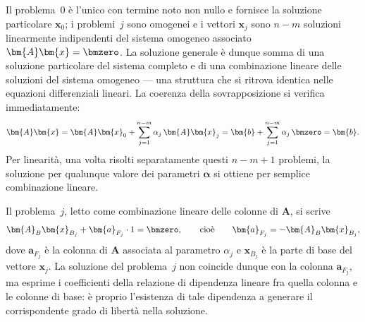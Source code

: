 Il problema~0 \`e l'unico con termine noto non nullo e fornisce
la soluzione particolare $\bm{x}_0$; i problemi~$j$ sono omogenei
e i vettori $\bm{x}_j$ sono $n-m$ soluzioni linearmente
indipendenti del sistema omogeneo associato $\bm{A}\bm{x}=\bmzero$.
La soluzione generale \`e dunque somma di una soluzione particolare
del sistema completo e di una combinazione lineare delle soluzioni
del sistema omogeneo --- una struttura che si ritrova identica
nelle equazioni differenziali lineari. La coerenza della
sovrapposizione si verifica immediatamente:
\begin{equation}
	\bm{A}\bm{x}
	= \bm{A}\bm{x}_0
	+ \sum_{j=1}^{n-m} \alpha_j\,\bm{A}\bm{x}_j
	= \bm{b} + \sum_{j=1}^{n-m} \alpha_j\,\bmzero
	= \bm{b}.
\end{equation}
Per linearit\`a, una volta risolti separatamente questi $n-m+1$
problemi, la soluzione per qualunque valore dei parametri
$\bm{\alpha}$ si ottiene per semplice combinazione lineare.

\begin{oss}
	Il problema~$j$, letto come combinazione lineare delle colonne di
	$\bm{A}$, si scrive
	\begin{equation}
		\bm{A}_B\bm{x}_{B_j} + \bm{a}_{F_j}\cdot 1 = \bmzero,
		\qquad\text{cio\`e}\qquad
		\bm{a}_{F_j} = -\bm{A}_B\bm{x}_{B_j},
	\end{equation}
	dove $\bm{a}_{F_j}$ \`e la colonna di $\bm{A}$ associata al
	parametro $\alpha_j$ e $\bm{x}_{B_j}$ \`e la parte di base del
	vettore $\bm{x}_j$. La soluzione del problema~$j$ non coincide
	dunque con la colonna $\bm{a}_{F_j}$, ma esprime i coefficienti
	della relazione di dipendenza lineare fra quella colonna e le
	colonne di base: \`e proprio l'esistenza di tale dipendenza a
	generare il corrispondente grado di libert\`a nella soluzione.
\end{oss}

